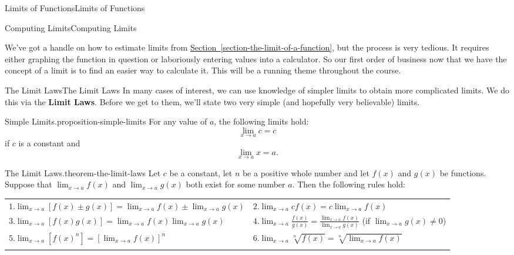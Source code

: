 \documentclass[10pt,]{book}
\newcommand{\terminology}[1]{\textbf{#1}}
\numberwithin{equation}{section}
\newcommand{\hrulethick} {\noalign{\hrule height 0.11em}}
\begin{document}
\begin{chapterptx}{Limits of Functions}{}{Limits of Functions}{}{}
\begin{sectionptx}{Computing Limits}{}{Computing Limits}{}{}
\begin{introduction}{}%
\hypertarget{p-19}{}%
We've got a handle on how to estimate limits from \hyperref[section-the-limit-of-a-function]{Section~\ref{section-the-limit-of-a-function}}, but the process is very tedious. It requires either graphing the function in question or laboriously entering values into a calculator. So our first order of business now that we have the concept of a limit is to find an easier way to calculate it. This will be a running theme throughout the course.%
\end{introduction}%
%
%
\typeout{************************************************}
\typeout{************************************************}
%
\begin{subsectionptx}{The Limit Laws}{}{The Limit Laws}{}{}\label{subsection-the-limit-laws}
\hypertarget{p-20}{}%
In many cases of interest, we can use knowledge of simpler limits to obtain more complicated limits. We do this via the \terminology{Limit Laws}. Before we get to them, we'll state two very simple (and hopefully very believable) limits.%
\begin{proposition}{Simple Limits.}{}{proposition-simple-limits}%
\hypertarget{p-21}{}%
For any value of \(a\), the following limits hold:%
\begin{equation*}
\lim_{x\to a}c = c
\end{equation*}
if \(c\) is a constant and%
\begin{equation*}
\lim_{x\to a}x = a.
\end{equation*}
%
\end{proposition}
\begin{theorem}{The Limit Laws.}{}{theorem-the-limit-laws}%
\hypertarget{p-22}{}%
Let \(c\) be a constant, let \(n\) be a positive whole number and let \(f(x)\) and \(g(x)\) be functions. Suppose that \(\lim_{x\to a}f(x)\) and \(\lim_{x\to a}g(x)\) both exist for some number \(a\). Then the following rules hold:%
\begin{table}
\centering
\begin{tabular}{ll}\hrulethick
\(1. \lim_{x\to a}[f(x)\pm g(x)] = \lim_{x\to a}f(x)\pm \lim_{x\to a}g(x)\)&\(2. \lim_{x\to a}cf(x) = c\lim_{x\to a}f(x)\)\tabularnewline[0pt]
\(3. \lim_{x\to a}[f(x)g(x)] = \lim_{x\to a}f(x)\lim_{x\to a}g(x)\)&\(4. \lim_{x\to a}\frac{f(x)}{g(x)} = \frac{\lim_{x\to a}f(x)}{\lim_{x\to a}g(x)}\) (if \(\lim_{x\to a}g(x)\neq 0\))\tabularnewline[0pt]
\(5. \lim_{x\to a}[f(x)^{n}] = [\lim_{x\to a}f(x)]^{n}\)&\(6. \lim_{x\to a}\sqrt[n]{f(x)} = \sqrt[n]{\lim_{x\to a}f(x)}\)\tabularnewline\hrulethick

\end{tabular}
\end{table}
\end{theorem}
\end{subsectionptx}
\end{sectionptx}
\end{chapterptx}
\end{document}
